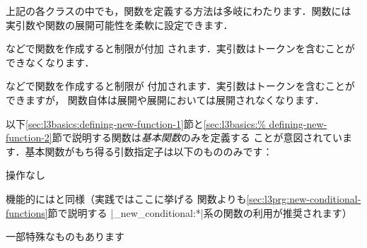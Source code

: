 \documentclass[uplatex,dvipdfmx,full,kernel]{wtpl3doc}
\begin{document}
\begin{documentation}
上記の各クラスの中でも，関数を定義する方法は多岐にわたります．関数には
実引数や関数の展開可能性を柔軟に設定できます．
%
\begin{description}[style=multiline, leftmargin=6zw]
  \item[\code{nopar}]
     などで関数を作成すると制限が付加
     されます．実引数はトークンを含むことができなくなります．
%
  \item[\code{protected}]
     などで関数を作成すると制限が
     付加されます．実引数はトークンを含むことができますが，
     関数自体は展開や展開においては展開されなくなります．
\end{description}

以下\ref{sec:l3basics:defining-new-function-1}節と\ref{sec:l3basics:%
defining-new-function-2}節で説明する関数は\emph{基本関数}のみを定義する
ことが意図されています．基本関数がもち得る引数指定子は以下のもののみです：
%
\begin{description}[style=multiline, leftmargin=3zw]
  \item[\code{N}/\code{n}] 操作なし
  \item[\code{T}/\code{F}] 機能的にはと同様（実践ではここに挙げる
    関数よりも\ref{sec:l3prg:new-conditional-functions}節で説明する
    |\prg_new_conditional:*|系の関数の利用が推奨されます）
  \item[\code{p}/\code{w}] 一部特殊なものもあります
\end{description}


\end{documentation}
\end{document}
